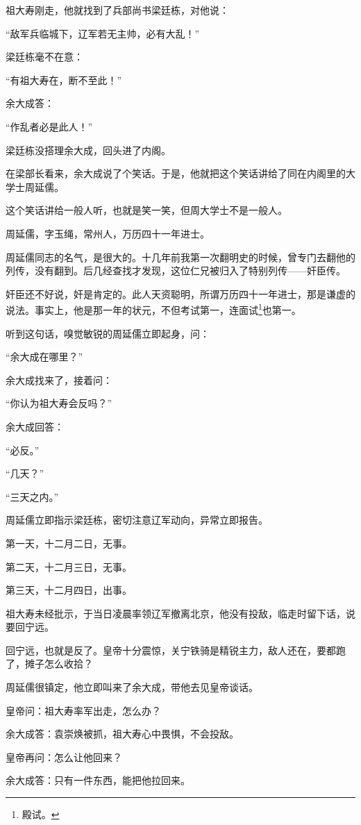 \begin{multicols}{\theparacolNo}
		祖大寿刚走，他就找到了兵部尚书梁廷栋，对他说：

		“敌军兵临城下，辽军若无主帅，必有大乱！”

		梁廷栋毫不在意：

		“有祖大寿在，断不至此！”

		余大成答：

		“作乱者必是此人！”

		梁廷栋没搭理余大成，回头进了内阁。

		在梁部长看来，余大成说了个笑话。于是，他就把这个笑话讲给了同在内阁里的大学士周延儒。

		这个笑话讲给一般人听，也就是笑一笑，但周大学士不是一般人。

		周延儒，字玉绳，常州人，万历四十一年进士。

		周延儒同志的名气，是很大的。十几年前我第一次翻明史的时候，曾专门去翻他的列传，没有翻到。后几经查找才发现，这位仁兄被归入了特别列传——奸臣传。

		奸臣还不好说，奸是肯定的。此人天资聪明，所谓万历四十一年进士，那是谦虚的说法。事实上，他是那一年的状元，不但考试第一，连面试\footnote{殿试。}也第一。

		听到这句话，嗅觉敏锐的周延儒立即起身，问：

		“余大成在哪里？”

		余大成找来了，接着问：

		“你认为祖大寿会反吗？”

		余大成回答：

		“必反。”

		“几天？”

		“三天之内。”

		周延儒立即指示梁廷栋，密切注意辽军动向，异常立即报告。

		第一天，十二月二日，无事。

		第二天，十二月三日，无事。

		第三天，十二月四日，出事。

		祖大寿未经批示，于当日凌晨率领辽军撤离北京，他没有投敌，临走时留下话，说要回宁远。

		回宁远，也就是反了。皇帝十分震惊，关宁铁骑是精锐主力，敌人还在，要都跑了，摊子怎么收拾？

		周延儒很镇定，他立即叫来了余大成，带他去见皇帝谈话。

		皇帝问：祖大寿率军出走，怎么办？

		余大成答：袁崇焕被抓，祖大寿心中畏惧，不会投敌。

		皇帝再问：怎么让他回来？

		余大成答：只有一件东西，能把他拉回来。


\end{multicols}

